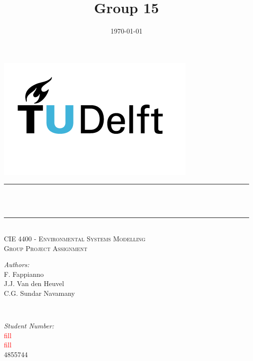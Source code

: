 \documentclass[11pt, hidelinks]{article}
\title{Group 15}								%
\date{\today}										            	%
\makeatletter
\let\thetitle\@title
\let\theauthor\@author
\makeatother
\begin{document}
\setlength{\parindent}{0cm}



\begin{titlepage}
	\centering
    \vspace*{0.5 cm}
    \includegraphics[scale = 1]{Images/Front_page/TUDelft.png}	%
    \textsc{\LARGE }\\	%
    
	\rule{\linewidth}{0.2 mm} \\[0.4 cm]
	{ \huge \bfseries \thetitle}\\
	\rule{\linewidth}{0.2 mm} \\[1.0 cm]
	
	\textsc{\Large CIE 4400 - Environmental Systems Modelling}\\[1 cm]
	\textsc{\Large Group Project Assignment}\\[1 cm]
	\begin{minipage}{0.4\textwidth}
		\begin{flushleft} \large
			\emph{Authors:}\\
            F. Fappianno \\
            J.J. Van den Heuvel \\
            C.G. Sundar Navamany \\
            
           
			\end{flushleft}
			\end{minipage}~
			\begin{minipage}{0.4\textwidth}
			\begin{flushright} \large
			\emph{Student Number:} \\
		    \textcolor{red}{fill}\\
			 \textcolor{red}{fill}\\
			4855744\\
			

\end{flushright}
\end{minipage}
\end{titlepage}
\end{document}
